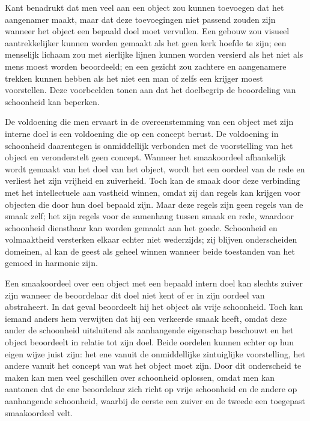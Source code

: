 \begin{mdframed}[leftmargin=0pt,rightmargin=0pt,backgroundcolor=blue!6,linecolor=white,innertopmargin=6pt,innerbottommargin=6pt]
Kant benadrukt dat men veel aan een object zou kunnen toevoegen dat het aangenamer maakt, maar dat deze toevoegingen niet passend zouden zijn wanneer het object een bepaald doel moet vervullen. Een gebouw zou visueel aantrekkelijker kunnen worden gemaakt als het geen kerk hoefde te zijn; een menselijk lichaam zou met sierlijke lijnen kunnen worden versierd als het niet als mens moest worden beoordeeld; en een gezicht zou zachtere en aangenamere trekken kunnen hebben als het niet een man of zelfs een krijger moest voorstellen. Deze voorbeelden tonen aan dat het doelbegrip de beoordeling van schoonheid kan beperken.

De voldoening die men ervaart in de overeenstemming van een object met zijn interne doel is een voldoening die op een concept berust. De voldoening in schoonheid daarentegen is onmiddellijk verbonden met de voorstelling van het object en veronderstelt geen concept. Wanneer het smaakoordeel afhankelijk wordt gemaakt van het doel van het object, wordt het een oordeel van de rede en verliest het zijn vrijheid en zuiverheid. Toch kan de smaak door deze verbinding met het intellectuele aan vastheid winnen, omdat zij dan regels kan krijgen voor objecten die door hun doel bepaald zijn. Maar deze regels zijn geen regels van de smaak zelf; het zijn regels voor de samenhang tussen smaak en rede, waardoor schoonheid dienstbaar kan worden gemaakt aan het goede. Schoonheid en volmaaktheid versterken elkaar echter niet wederzijds; zij blijven onderscheiden domeinen, al kan de geest als geheel winnen wanneer beide toestanden van het gemoed in harmonie zijn.

Een smaakoordeel over een object met een bepaald intern doel kan slechts zuiver zijn wanneer de beoordelaar dit doel niet kent of er in zijn oordeel van abstraheert. In dat geval beoordeelt hij het object als vrije schoonheid. Toch kan iemand anders hem verwijten dat hij een verkeerde smaak heeft, omdat deze ander de schoonheid uitsluitend als aanhangende eigenschap beschouwt en het object beoordeelt in relatie tot zijn doel. Beide oordelen kunnen echter op hun eigen wijze juist zijn: het ene vanuit de onmiddellijke zintuiglijke voorstelling, het andere vanuit het concept van wat het object moet zijn. Door dit onderscheid te maken kan men veel geschillen over schoonheid oplossen, omdat men kan aantonen dat de ene beoordelaar zich richt op vrije schoonheid en de andere op aanhangende schoonheid, waarbij de eerste een zuiver en de tweede een toegepast smaakoordeel velt.


\end{mdframed}
